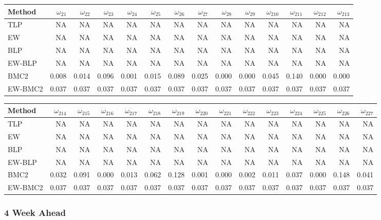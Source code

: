 \documentclass[
]{article}
\begin{document}
\begin{tabular}{lrrrrrrrrrrrrr}
\toprule
Method & $\omega_{21}$ & $\omega_{22}$ & $\omega_{23}$ & $\omega_{24}$ & $\omega_{25}$ & $\omega_{26}$ & $\omega_{27}$ & $\omega_{28}$ & $\omega_{29}$ & $\omega_{210}$ & $\omega_{211}$ & $\omega_{212}$ & $\omega_{213}$\\
\midrule
TLP & NA & NA & NA & NA & NA & NA & NA & NA & NA & NA & NA & NA & NA\\
EW & NA & NA & NA & NA & NA & NA & NA & NA & NA & NA & NA & NA & NA\\
BLP & NA & NA & NA & NA & NA & NA & NA & NA & NA & NA & NA & NA & NA\\
EW-BLP & NA & NA & NA & NA & NA & NA & NA & NA & NA & NA & NA & NA & NA\\
BMC2 & 0.008 & 0.014 & 0.096 & 0.001 & 0.015 & 0.089 & 0.025 & 0.000 & 0.000 & 0.045 & 0.140 & 0.000 & 0.000\\
EW-BMC2 & 0.037 & 0.037 & 0.037 & 0.037 & 0.037 & 0.037 & 0.037 & 0.037 & 0.037 & 0.037 & 0.037 & 0.037 & 0.037\\
\bottomrule
\end{tabular}

\begin{tabular}{lrrrrrrrrrrrrrr}
\toprule
Method & $\omega_{214}$ & $\omega_{215}$ & $\omega_{216}$ & $\omega_{217}$ & $\omega_{218}$ & $\omega_{219}$ & $\omega_{220}$ & $\omega_{221}$ & $\omega_{222}$ & $\omega_{223}$ & $\omega_{224}$ & $\omega_{225}$ & $\omega_{226}$ & $\omega_{227}$\\
\midrule
TLP & NA & NA & NA & NA & NA & NA & NA & NA & NA & NA & NA & NA & NA & NA\\
EW & NA & NA & NA & NA & NA & NA & NA & NA & NA & NA & NA & NA & NA & NA\\
BLP & NA & NA & NA & NA & NA & NA & NA & NA & NA & NA & NA & NA & NA & NA\\
EW-BLP & NA & NA & NA & NA & NA & NA & NA & NA & NA & NA & NA & NA & NA & NA\\
BMC2 & 0.032 & 0.091 & 0.000 & 0.013 & 0.062 & 0.128 & 0.001 & 0.000 & 0.002 & 0.011 & 0.037 & 0.000 & 0.148 & 0.041\\
EW-BMC2 & 0.037 & 0.037 & 0.037 & 0.037 & 0.037 & 0.037 & 0.037 & 0.037 & 0.037 & 0.037 & 0.037 & 0.037 & 0.037 & 0.037\\
\bottomrule
\end{tabular}

\hypertarget{week-ahead-15}{%
\subsubsection{4 Week Ahead}\label{week-ahead-15}}
\end{document}
